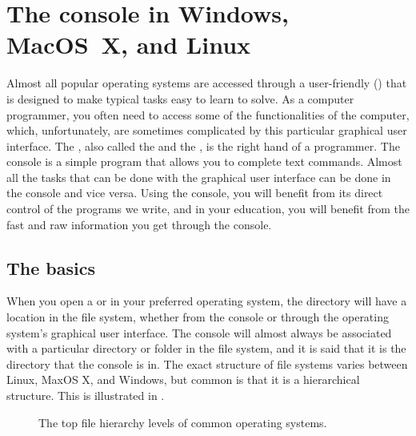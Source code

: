 \chapter{The console in Windows, MacOS~X, and Linux}
\label{chap:console}
Almost all popular operating systems are accessed through a
user-friendly  () that is designed to make typical tasks easy to learn to solve. As a computer programmer, you often need to access some of the functionalities of the computer, which, unfortunately, are sometimes complicated by this particular graphical user interface. The , also called the  and the , is the right hand of a programmer. The console is a simple program that allows you to complete text commands. Almost all the tasks that can be done with the graphical user interface can be done in the console and vice versa. Using the console, you will benefit from its direct control of the programs we write, and in your education, you will benefit from the fast and raw information you get through the console.


\section{The basics}
When you open a  or  in your preferred operating system, the directory will have a location in the file system, whether from the console or through the operating system's graphical user interface. The console will almost always be associated with a particular directory or folder in the file system, and it is said that it is the directory that the console is in. The exact structure of file systems varies between Linux, MaxOS X, and Windows, but common is that it is a hierarchical structure. This is illustrated in .
\begin{figure}
  \begin{center}
  \end{center}
  \caption{The top file hierarchy levels of common operating systems.}
  \label{fig:filhierakier}
\end{figure}

